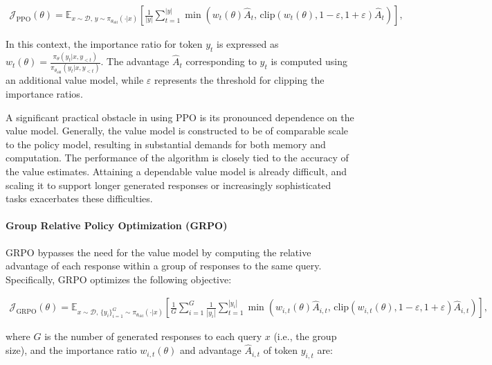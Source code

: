 \begin{align}
\mathcal{J}_\text{PPO}(\theta) = \mathbb{E}_{ x \sim \mathcal{D},\, y \sim \pi_{\theta_\text{old}}( \cdot | x) }
\left[ \frac{1}{|y|} \sum_{t=1}^{|y|} 
\min \left( w_{t}(\theta) \widehat{A}_{t},  \, \mathrm{clip} \left( w_{t}(\theta), 1 - {\varepsilon}, 1 + {\varepsilon}\right) \widehat{A}_{t} \right)
\right],
\end{align}

In this context, the importance ratio for token $y_t$ is expressed as $
w_{t}(\theta) = \frac{ \pi_{\theta} (y_{t} | x, y_{<t}) }{ \pi_{\theta_\text{old}} (y_{t} | x,y_{<t})} $. The advantage $\widehat{A}_{t}$ corresponding to $y_t$ is computed using an additional value model, while $\varepsilon$ represents the threshold for clipping the importance ratios.

A significant practical obstacle in using PPO is its pronounced dependence on the value model. Generally, the value model is constructed to be of comparable scale to the policy model, resulting in substantial demands for both memory and computation. The performance of the algorithm is closely tied to the accuracy of the value estimates. Attaining a dependable value model is already difficult, and scaling it to support longer generated responses or increasingly sophisticated tasks exacerbates these difficulties.

\paragraph{Group Relative Policy Optimization (GRPO)} GRPO \citep{grpo} bypasses the need for the value model by computing the relative advantage of each response within a group of responses to the same query. Specifically, GRPO optimizes the following objective:

\begin{align}
\label{equ:grpo}
\mathcal{J}_\text{GRPO}(\theta) = \mathbb{E}_{ x \sim \mathcal{D},\, \{y_i\}_{i=1}^G \sim \pi_{\theta_\text{old}}( \cdot | x) }
\left[ \frac{1}{G} \sum_{i=1}^{G} \frac{1}{|y_i|} \sum_{t=1}^{|y_i|} 
\min \left( w_{i,t}(\theta) \widehat{A}_{i,t},  \, \mathrm{clip} \left( w_{i,t}(\theta), 1 - {\varepsilon}, 1 + {\varepsilon}\right) \widehat{A}_{i,t} \right)
\right],
\end{align}

where $G$ is the number of generated responses to each query $x$ (i.e., the group size), and the importance ratio $w_{i,t}(\theta)$ and advantage $\widehat{A}_{i,t}$ of token $y_{i,t}$ are:

